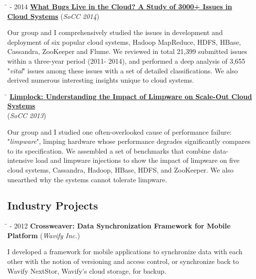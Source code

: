 \documentclass[10pt]{article} %
\begin{document}
\begin{tabbing}
\hspace{2.5cm} \=  - 2014 \>\+ \href{http://ucare.cs.uchicago.edu/pdf/socc14-cbs.pdf}{\textbf{What Bugs Live in the Cloud? A Study of 3000+ Issues in Cloud Systems}} (\textit{SoCC 2014}) \\
\begin{minipage}{\smallertextwidth}
Our group and I comprehensively studied the issues in development and deployment of six
popular cloud systems, Hadoop MapReduce, HDFS, HBase, Cassandra, ZooKeeper and
Flume. We reviewed in total 21,399 submitted issues within a three-year period
(2011- 2014), and performed a deep analysis of 3,655 "\textit{vital}" issues among these
issues with a set of detailed classifications. We also derived numerous
interesting insights unique to cloud systems. 
\end{minipage}
\end{tabbing}

\begin{tabbing}
\hspace{2.5cm} \=  \> \href{http://ucare.cs.uchicago.edu/pdf/socc13-limplock.pdf}{\textbf{Limplock: Understanding the Impact of Limpware on Scale-Out Cloud Systems}} \\
\>\+ (\textit{SoCC 2013}) \\
\begin{minipage}{\smallertextwidth}
Our group and I studied one often-overlooked cause of performance failure:
"\textit{limpware}", limping hardware whose performance degrades significantly
compares to its specification. We assembled a set of benchmarks that combine
data-intensive load and limpware injections to show the impact of limpware on
five cloud systems, Cassandra, Hadoop, HBase, HDFS, and ZooKeeper. We
also unearthed why the systems cannot tolerate limpware.
\end{minipage}
\end{tabbing}

\subsection{Industry Projects}

\begin{tabbing}
\hspace{2.5cm} \=  - 2012 \>\+ \textbf{Crossweaver: Data Synchronization Framework for Mobile Platform} (\textit{Wavify Inc.}) \\
\begin{minipage}{\smallertextwidth}
I developed a framework for mobile applications to synchronize data with each
other with the notion of versioning and access control, or synchronize back to
Wavify NextStor, Wavify's cloud storage, for backup.
\end{minipage}
\end{tabbing}
\end{document}
